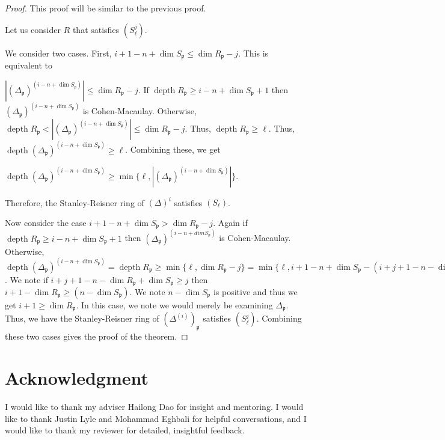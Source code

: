 \documentclass[11pt]{amsart}
\numberwithin{equation}{section}
\theoremstyle{definition}
\theoremstyle{remark}
\newcommand{\depth}{\operatorname{depth}}
\begin{document}
\begin{proof}
This proof will be similar to the previous proof.

Let us consider $R$ that satisfies $(S_\ell^j)$.  

We consider two cases.  First, $i+1-n+\dim S_\mathfrak{p} \leq \dim R_\mathfrak{p} -j$.  This is equivalent to 

$|(\Delta_\mathfrak{p})^{(i-n+\dim S_\mathfrak{p})}| \leq \dim R_\mathfrak{p} -j$.  If $\depth R_\mathfrak{p} \geq i-n+\dim S_\mathfrak{p}+1$ then $(\Delta_\mathfrak{p})^{(i-n+\dim S_\mathfrak{p})}$ is Cohen-Macaulay.  Otherwise, $\depth R_\mathfrak{p} < |(\Delta_\mathfrak{p})^{(i-n+\dim S_\mathfrak{p})}| \leq \dim R_\mathfrak{p} -j$.  Thus, $\depth R_\mathfrak{p} \geq \ell$.  Thus, $\depth (\Delta_\mathfrak{p})^{(i-n+\dim S_\mathfrak{p})} \geq \ell$.  Combining these, we get

$\depth (\Delta_\mathfrak{p})^{(i-n+\dim S_\mathfrak{p})} \geq \min \{ \ell, |(\Delta_\mathfrak{p})^{(i-n+\dim S_\mathfrak{p})}| \}$.  

Therefore, the Stanley-Reisner ring of $(\Delta)^{i}$ satisfies $(S_\ell)$.

Now consider the case $i +1-n+\dim S_\mathfrak{p} > \dim R_\mathfrak{p}-j$.  Again if $\depth R_\mathfrak{p} \geq i-n+\dim S_\mathfrak{p}+1$ then $(\Delta_\mathfrak{p})^{(i-n+ dim S_\mathfrak{p})}$ is Cohen-Macaulay.  Otherwise, $\depth (\Delta_\mathfrak{p})^{(i-n+ \dim S_\mathfrak{p})} =\depth R_\mathfrak{p} \geq \min \{ \ell, \dim R_\mathfrak{p} - j \} = \min \{ \ell, i+1-n + \dim S_\mathfrak{p} - (i+j+1-n-\dim R_\mathfrak{p} + \dim S_\mathfrak{p})\}$.  We note if $i+j+1-n-\dim R_\mathfrak{p} + \dim S_\mathfrak{p} \geq j$ then $i+1-\dim R_\mathfrak{p} \geq (n-\dim S_\mathfrak{p})$.  We note $n-\dim S_\mathfrak{p}$ is positive and thus we get $i+1 \geq \dim R_\mathfrak{p}$.  In this case, we note we would merely be examining $\Delta_\mathfrak{p}$.  Thus, we have the Stanley-Reisner ring of $(\Delta ^{(i)})_\mathfrak{p}$ satisfies $(S_\ell^j)$.  Combining these two cases gives the proof of the theorem.

\end{proof}

\section*{Acknowledgment}
I would like to thank my adviser Hailong Dao for insight and mentoring.  I would like to thank Justin Lyle and Mohammad Eghbali for helpful conversations, and I would like to thank my reviewer for detailed, insightful feedback.



\end{document}
